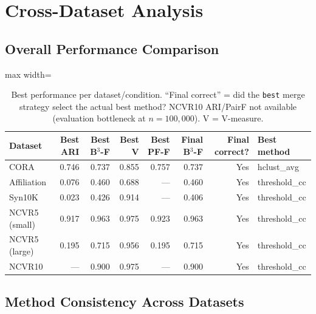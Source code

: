 \documentclass[11pt, a4paper]{article}
\newcommand{\na}{---}
\begin{document}
\section{Cross-Dataset Analysis}

\subsection{Overall Performance Comparison}

\begin{table}[h!]
\centering
\small
\begin{adjustbox}{max width=\linewidth}
\begin{tabular}{lrrrrrrl}
\toprule
\textbf{Dataset} & \textbf{Best ARI} & \textbf{Best B$^3$-F} & \textbf{Best V} &
\textbf{Best PF-F} & \textbf{Final B$^3$-F} & \textbf{Final correct?} & \textbf{Best method} \\
\midrule
CORA          & 0.746 & 0.737 & 0.855 & 0.757 & 0.737 & Yes & hclust\_avg \\
Affiliation   & 0.076 & 0.460 & 0.688 & \na   & 0.460 & Yes & threshold\_cc \\
Syn10K        & 0.023 & 0.426 & 0.914 & \na   & 0.406 & Yes & threshold\_cc \\
NCVR5 (small) & 0.917 & 0.963 & 0.975 & 0.923 & 0.963 & Yes & threshold\_cc \\
NCVR5 (large) & 0.195 & 0.715 & 0.956 & 0.195 & 0.715 & Yes & threshold\_cc \\
NCVR10        & \na   & 0.900 & 0.975 & \na   & 0.900 & Yes & threshold\_cc \\
\bottomrule
\end{tabular}
\end{adjustbox}
\caption{Best performance per dataset/condition. ``Final correct'' = did the \texttt{best}
merge strategy select the actual best method? NCVR10 ARI/PairF not available (evaluation
bottleneck at $n=100{,}000$). V = V-measure.}
\end{table}

\subsection{Method Consistency Across Datasets}
\end{document}
